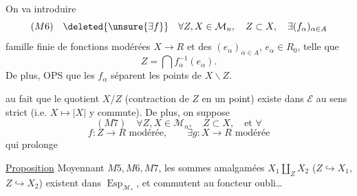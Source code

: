 On va introduire
\[
(M6)\quad \deleted{\unsure{\exists f}}\quad
\forall Z,X\in\mathcal M_n,\quad Z\subset X,\quad\exists(f_\alpha)_{\alpha\in A}
\]
famille finie de fonctions modérées $X\longrightarrow R$ et des $(e_\alpha)_{\alpha\in A}$, $e_\alpha\in R_0$, telle que
\[
 Z=\bigcap f_\alpha^{-1}(e_\alpha).
\]
De plus, OPS que les $f_\alpha$ séparent les points de $X\smallsetminus Z$.




 \uline{} au fait que le quotient $X/Z$ (contraction de $Z$ en un point) existe dans $\mathcal E$ au sens strict (i.e. $X\mapsto|X|$ y commute). De plus, on suppose
\[
(M7)\quad\forall Z,X\in\mathcal M_n,\quad Z\subset X,\quad\text{et }\forall
\]
\[
f:Z\longrightarrow R\text{ modérée},\qquad\exists g:X\longrightarrow R\text{ modérée}
\]
qui prolonge 

\uline{Proposition} Moyennant $M5,M6,M7$, les sommes amalgamées $X_1\amalg_Z X_2$ ($Z\hookrightarrow X_1$, $Z\hookrightarrow X_2$) existent dans $\operatorname{Esp}_{\mathcal M_*}$, et commutent au foncteur oubli\ldots
{}
